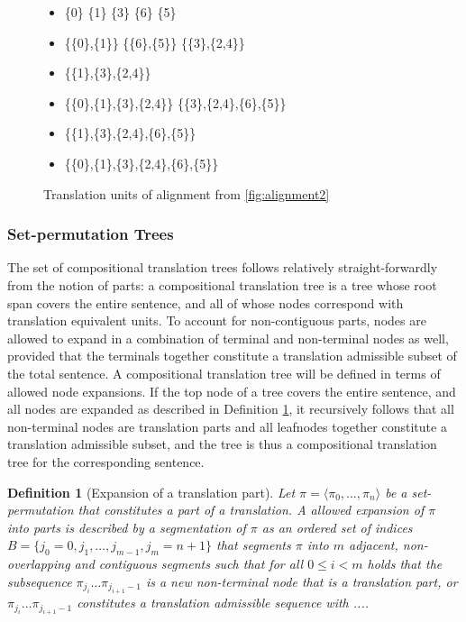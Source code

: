 \documentclass{report}
\theoremstyle{break}
\newtheorem{definition}{Definition}
\begin{document}
\begin{figure}[!ht]
\begin{framed}
\small{
\begin{itemize}
\item \{0\} \hfill \{1\} \hfill \{3\} \hfill \{6\} \hfill \{5\} \hfill
\item \{\{0\},\{1\}\} \hfill  \{\{6\},\{5\}\} \hfill \{\{3\},\{2,4\}\}
\item \{\{1\},\{3\},\{2,4\}\}
\item \{\{0\},\{1\},\{3\},\{2,4\}\} \hfill \{\{3\},\{2,4\},\{6\},\{5\}\}
\item \{\{1\},\{3\},\{2,4\},\{6\},\{5\}\}
\item \{\{0\},\{1\},\{3\},\{2,4\},\{6\},\{5\}\}
\end{itemize}
}
\end{framed}
\caption{Translation units of alignment from \ref{fig:alignment2}}\label{fig:transequi}
\end{figure}


\subsubsection{Set-permutation Trees}

The set of compositional translation trees follows relatively straight-forwardly from the notion of parts: a compositional translation tree is a tree whose root span covers the entire sentence, and all of whose nodes correspond with translation equivalent units. To account for non-contiguous parts, nodes are allowed to expand in a combination of terminal and non-terminal nodes as well, provided that the terminals together constitute a translation admissible subset of the total sentence. A compositional translation tree will be defined in terms of allowed node expansions. If the top node of a tree covers the entire sentence, and all nodes are expanded as described in Definition \ref{def:exp1}, it recursively follows that all non-terminal nodes are translation parts and all leafnodes together constitute a translation admissible subset, and the tree is thus a compositional translation tree for the corresponding sentence.

\begin{definition}[Expansion of a translation part]\label{def:exp1}
Let $\pi = \langle \pi_0, \ldots,\pi_n\rangle$ be a set-permutation that constitutes a part of a translation. A allowed expansion of $\pi$ into parts is described by a segmentation of $\pi$ as an ordered set of indices $B = \{j_0 = 0, j_1, \ldots ,j_{m-1},j_m = n+1\}$ that segments $\pi$ into $m$ adjacent, non-overlapping and contiguous segments such that for all $0\leq i < m$ holds that the subsequence $\pi_{j_i}\ldots\pi_{j_{i+1}-1}$ is a new non-terminal node that is a translation part, or $\pi_{j_i}\ldots\pi_{j_{i+1}-1}$ constitutes a translation admissible sequence with ....
\end{definition}
\end{document}
